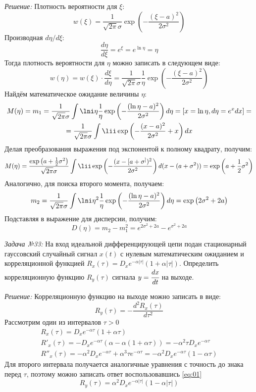 \documentclass[14pt, final, titlepage, pscyr]{hedwork}
\begin{document}
\emph{Решение:} Плотность вероятности для \( \xi \):
\[
    w(\xi) = \frac{1}{\sqrt{2\pi}\sigma} \exp\left( 
        -\frac{(\xi-a)^2}{2\sigma^2} 
    \right)
\]
Производная \( d\eta/d\xi \):
\[
    \frac{d\eta}{d\xi} = e^{\xi} = e^{\ln\eta} = \eta
\]
Тогда плотность вероятности для \( \eta \) можно записать в следующем виде:
\[
    w(\eta) = w(\xi)\cdot\frac{d\xi}{d\eta} = 
        \frac{1}{\sqrt{2\pi}\sigma} \frac{1}{\eta} \exp\left( 
            -\frac{(\xi-a)^2}{2\sigma^2} 
        \right)
\]
Найдём математическое ожидание величины \( \eta \):
\begin{gather}
    M(\eta) = m_1 = \frac{1}{\sqrt{2\pi}\sigma} \int\lni \eta \frac{1}{\eta}
        \exp\left( -\frac{(\ln\eta-a)^2}{2\sigma^2} \right) 
        d\eta = \left[ x = \ln\eta, d\eta = e^x dx \right] =
    \nonumber \\
    = \frac{1}{\sqrt{2\pi}\sigma} \int\lii
        \exp\left( -\frac{(x-a)^2}{2\sigma^2} + x \right) dx \nonumber
\end{gather}
Делая преобразования выражения под экспонентой к полному квадрату, получим:
\begin{gather}
    M(\eta) = \frac{\exp\left( 
        a + \frac{1}{2}\sigma^2 
    \right)}{\sqrt{2\pi}\sigma} \int\lii \exp\left( 
        -\frac{(x-[a+\sigma^])^2}{2\sigma^2}
    \right) d(x-(a+\sigma^2)) = \exp\left( a + \frac{1}{2}\sigma^2 \right)
    \nonumber
\end{gather}
Аналогично, для поиска второго момента, получаем:
\[
    m_2 = \frac{1}{\sqrt{2\pi}\sigma} \int\lni \eta^2 \frac{1}{\eta} \exp\left( 
        -\frac{(\ln\eta-a)^2}{2\sigma^2} \right) d\eta = 
        \exp\left( 2\sigma^2 + 2a \right)
\]
Подставляя в выражение для дисперсии, получим:
\[
    D(\eta) = m_2 - m_1^2 = e^{2\sigma^2+2a} - e^{\sigma^2+2a}
\]

\newpage

\emph{Задача №33:} На вход идеальной дифференцирующей цепи подан стационарный 
гауссовский случайный сигнал \( x(t) \) с нулевым математическим ожиданием и 
корреляционной функцией 
\( R_x(\tau) = D_x e^{-\alpha|\tau|}(1 + \alpha|\tau|) \). Определить 
корреляционную функцию \( R_y(\tau) \) сигнала \( y = \cfrac{dx}{dt} \) на 
выходе.

\emph{Решение:} Корреляционную функцию на выходе можно записать в виде:
\begin{equation}
    R_y(\tau) = -\frac{d^2 R_x(\tau)}{d\tau^2}
    \label{eq:01}
\end{equation}
Рассмотрим один из интервалов \( \tau > 0 \)
\begin{gather}
    R_x(\tau) = D_x e^{-\alpha\tau}(1+\alpha\tau) \nonumber \\
    R'_x(\tau) = -D_x e^{-\alpha\tau}(\alpha-\alpha(1+\alpha\tau)) = 
    -\alpha^2\tau D_x e^{-\alpha\tau} \nonumber \\
    R''_x(\tau) = -\alpha^2 D_x e^{-\alpha\tau} + \alpha^3 \tau 
        e^{-\alpha\tau} = -\alpha^2 D_x e^{-\alpha\tau} ( 1 - \alpha\tau ) 
    \nonumber
\end{gather}
Для второго интервала получается аналогичные уравнения с точность до знака 
перед \( \tau \), поэтому можно записать ответ воспользовавшись \eqref{eq:01}
\[
    R_y(\tau) = \alpha^2 D_x e^{-\alpha|\tau|} ( 1 - \alpha|\tau| )
\]
\end{document}
